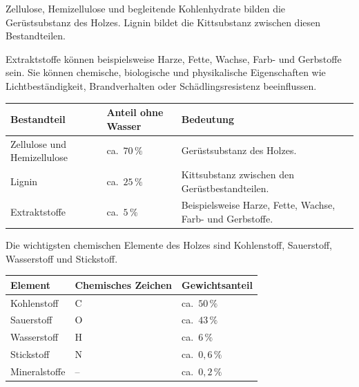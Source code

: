 \documentclass[
  12pt,
  a4paper,
  oneside
]{scrreprt}
\begin{document}
Zellulose, Hemizellulose und begleitende Kohlenhydrate bilden die
Gerüstsubstanz des Holzes. Lignin bildet die Kittsubstanz zwischen
diesen Bestandteilen. 

Extraktstoffe können beispielsweise Harze, Fette, Wachse, Farb- und
Gerbstoffe sein. Sie können chemische, biologische und physikalische
Eigenschaften wie Lichtbeständigkeit, Brandverhalten oder
Schädlingsresistenz beeinflussen. 

\begin{longtable}{
  >{\raggedright\arraybackslash}p{}
  >{\centering\arraybackslash}p{}
  >{\raggedright\arraybackslash}p{}
}
\toprule
\textbf{Bestandteil} &
\textbf{Anteil ohne Wasser} &
\textbf{Bedeutung} \\
\midrule
\endhead

Zellulose und Hemizellulose &
ca.\ $70\,\%$ &
Gerüstsubstanz des Holzes. \\

Lignin &
ca.\ $25\,\%$ &
Kittsubstanz zwischen den Gerüstbestandteilen. \\

Extraktstoffe &
ca.\ $5\,\%$ &
Beispielsweise Harze, Fette, Wachse, Farb- und Gerbstoffe. \\

\bottomrule
\end{longtable}



Die wichtigsten chemischen Elemente des Holzes sind Kohlenstoff,
Sauerstoff, Wasserstoff und Stickstoff.

\begin{longtable}{
  >{\raggedright\arraybackslash}p{}
  >{\centering\arraybackslash}p{}
  >{\centering\arraybackslash}p{}
}
\toprule
\textbf{Element} &
\textbf{Chemisches Zeichen} &
\textbf{Gewichtsanteil} \\
\midrule
\endhead

Kohlenstoff &
C &
ca.\ $50\,\%$ \\

Sauerstoff &
O &
ca.\ $43\,\%$ \\

Wasserstoff &
H &
ca.\ $6\,\%$ \\

Stickstoff &
N &
ca.\ $0{,}6\,\%$ \\

Mineralstoffe &
-- &
ca.\ $0{,}2\,\%$ \\

\bottomrule
\end{longtable}
\end{document}
